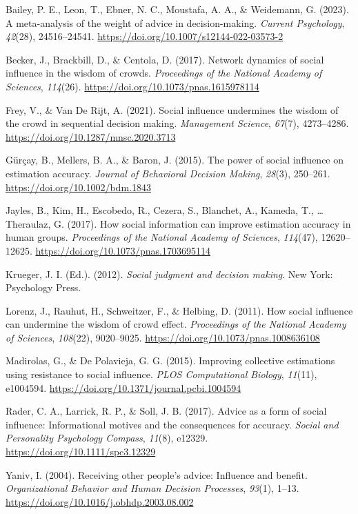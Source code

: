 \documentclass[
  man,floatsintext]{apa6}
\newlength{\cslhangindent}
\newenvironment{CSLReferences}[2] %
 {\begin{list}{}{%
  \setlength{\itemindent}{0pt}
  \setlength{\leftmargin}{0pt}
  \setlength{\parsep}{0pt}
  \ifodd #1
   \setlength{\leftmargin}{\cslhangindent}
   \setlength{\itemindent}{-1\cslhangindent}
  \fi
  \setlength{\itemsep}{#2\baselineskip}}}
 {\end{list}}
\begin{document}
\label{refs}
\begin{CSLReferences}{1}{0}
Bailey, P. E., Leon, T., Ebner, N. C., Moustafa, A. A., \& Weidemann, G. (2023). A meta-analysis of the weight of advice in decision-making. \emph{Current Psychology}, \emph{42}(28), 24516--24541. \url{https://doi.org/10.1007/s12144-022-03573-2}

Becker, J., Brackbill, D., \& Centola, D. (2017). Network dynamics of social influence in the wisdom of crowds. \emph{Proceedings of the National Academy of Sciences}, \emph{114}(26). \url{https://doi.org/10.1073/pnas.1615978114}

Frey, V., \& Van De Rijt, A. (2021). Social influence undermines the wisdom of the crowd in sequential decision making. \emph{Management Science}, \emph{67}(7), 4273--4286. \url{https://doi.org/10.1287/mnsc.2020.3713}

Gürçay, B., Mellers, B. A., \& Baron, J. (2015). The power of social influence on estimation accuracy. \emph{Journal of Behavioral Decision Making}, \emph{28}(3), 250--261. \url{https://doi.org/10.1002/bdm.1843}

Jayles, B., Kim, H., Escobedo, R., Cezera, S., Blanchet, A., Kameda, T., \ldots{} Theraulaz, G. (2017). How social information can improve estimation accuracy in human groups. \emph{Proceedings of the National Academy of Sciences}, \emph{114}(47), 12620--12625. \url{https://doi.org/10.1073/pnas.1703695114}

Krueger, J. I. (Ed.). (2012). \emph{Social judgment and decision making}. New York: Psychology Press.

Lorenz, J., Rauhut, H., Schweitzer, F., \& Helbing, D. (2011). How social influence can undermine the wisdom of crowd effect. \emph{Proceedings of the National Academy of Sciences}, \emph{108}(22), 9020--9025. \url{https://doi.org/10.1073/pnas.1008636108}

Madirolas, G., \& De Polavieja, G. G. (2015). Improving collective estimations using resistance to social influence. \emph{{PLOS} Computational Biology}, \emph{11}(11), e1004594. \url{https://doi.org/10.1371/journal.pcbi.1004594}

Rader, C. A., Larrick, R. P., \& Soll, J. B. (2017). Advice as a form of social influence: Informational motives and the consequences for accuracy. \emph{Social and Personality Psychology Compass}, \emph{11}(8), e12329. \url{https://doi.org/10.1111/spc3.12329}

Yaniv, I. (2004). Receiving other people's advice: Influence and benefit. \emph{Organizational Behavior and Human Decision Processes}, \emph{93}(1), 1--13. \url{https://doi.org/10.1016/j.obhdp.2003.08.002}

\end{CSLReferences}
\end{document}
